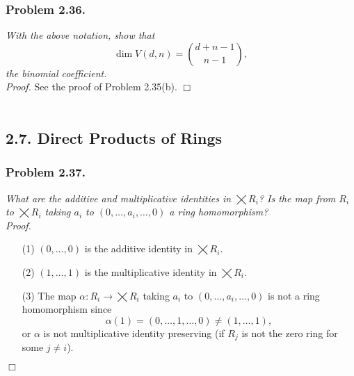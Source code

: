 \documentclass{article}
\begin{document}
\subsubsection*{Problem 2.36.}
\emph{With the above notation, show that
\[
  \dim V(d,n) = {d+n-1 \choose n-1},
\]
the binomial coefficient.} \\



\emph{Proof.}
See the proof of Problem 2.35(b).
$\Box$ \\\\






\subsection*{2.7. Direct Products of Rings \\}



\subsubsection*{Problem 2.37.}
\emph{What are the additive and multiplicative identities in $\bigtimes R_i$?
Is the map from $R_i$ to $\bigtimes R_i$ taking $a_i$ to $(0,\ldots,a_i,\ldots,0)$ a ring homomorphism?} \\

\emph{Proof.}
\begin{enumerate}
\item[(1)]
  $(0, \ldots, 0)$ is the additive identity in $\bigtimes R_i$.

\item[(2)]
  $(1, \ldots, 1)$ is the multiplicative identity in $\bigtimes R_i$.

\item[(3)]
  The map $\alpha: R_i \to \bigtimes R_i$ taking $a_i$ to $(0,\ldots,a_i,\ldots,0)$
  is not a ring homomorphism
  since
  \[
    \alpha(1) = (0,\ldots,1,\ldots,0) \neq (1, \ldots, 1),
  \]
  or $\alpha$ is not multiplicative identity preserving
  (if $R_j$ is not the zero ring for some $j \neq i$).
\end{enumerate}
$\Box$ \\\\
\end{document}

